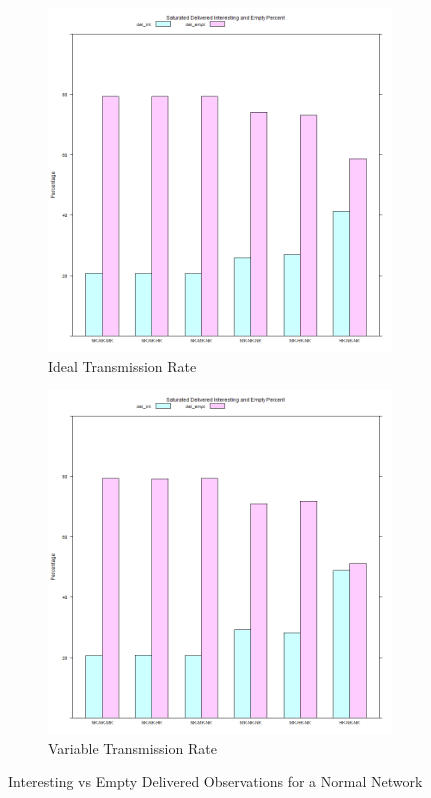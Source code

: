 \begin{figure}[H]
\centering
\begin{subfigure}{.5\textwidth}
  \centering
\includegraphics[width=\linewidth]{Chap7/figures/plots/saturated_ideal/emptvsint_percent.png}
  \caption{Ideal Transmission Rate}
	\label{fig:sim:res:sat:ideal:emptint}
\end{subfigure}%
\begin{subfigure}{.5\textwidth}
  \centering
\includegraphics[width=\linewidth]{Chap7/figures/plots/saturated_variable/emptvsint_percent.png}
  \caption{Variable Transmission Rate}
	\label{fig:sim:res:sat:variable:emptint}
\end{subfigure}
\caption{Interesting vs Empty Delivered Observations for a Normal Network}
\end{figure}



